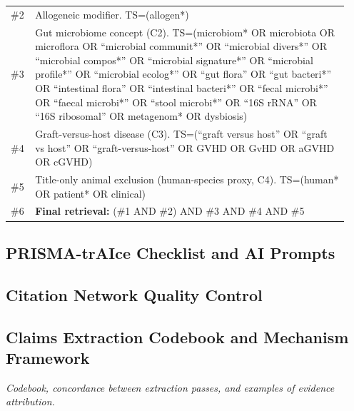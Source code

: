 \documentclass[11pt,a4paper]{article}
\newcommand{\placeholder}[1]{\par\medskip\noindent\colorbox{gray!15}{\parbox{\dimexpr\linewidth-2\fboxsep}{%
  \small\textit{#1}}}\par\medskip}
\begin{document}
\begin{longtable}{@{}p{0.06\linewidth} p{0.88\linewidth}@{}}
\#2 & Allogeneic modifier.\newline
TS=(allogen*)\\

\#3 & Gut microbiome concept (C2).\newline
TS=(microbiom* OR microbiota OR microflora OR
``microbial communit*'' OR ``microbial divers*'' OR
``microbial compos*'' OR ``microbial signature*'' OR
``microbial profile*'' OR ``microbial ecolog*'' OR
``gut flora'' OR ``gut bacteri*'' OR
``intestinal flora'' OR ``intestinal bacteri*'' OR
``fecal microbi*'' OR ``faecal microbi*'' OR
``stool microbi*'' OR ``16S rRNA'' OR ``16S ribosomal'' OR
metagenom* OR dysbiosis)\\

\#4 & Graft-versus-host disease (C3).\newline
TS=(``graft versus host'' OR ``graft vs host'' OR
``graft-versus-host'' OR GVHD OR GvHD OR aGVHD OR cGVHD)\\

\#5 & Title-only animal exclusion (human-species proxy, C4).\newline
TS=(human* OR patient* OR clinical)
\\

\#6 & \textbf{Final retrieval:} (\#1 AND \#2) AND \#3 AND \#4 AND \#5\\

\end{longtable}
\endgroup

\subsection{PRISMA-trAIce Checklist and AI Prompts}\label{sup:traice} \placeholder{}
\subsection{Citation Network Quality Control}\label{sup:citation-qc} \placeholder{}
\subsection{Claims Extraction Codebook and Mechanism Framework}\label{sup:codebook} \placeholder{Codebook, concordance between extraction passes, and examples of evidence attribution.}
\end{document}
